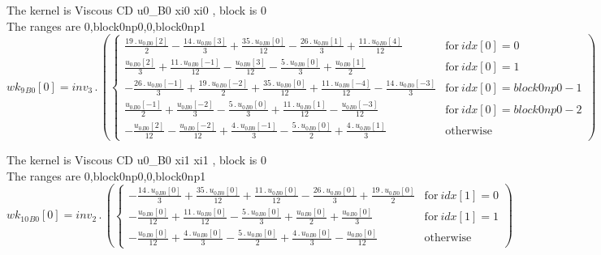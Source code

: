 \documentclass{article}
\begin{document}
\noindent The kernel is Viscous CD u0_B0 xi0 xi0 , block is 0\\\noindent The ranges are 0,block0np0,0,block0np1\\\begin{dmath}{wk_{9}{_{B0}}}[{0}] = inv_3 \,.\, \left(\begin{cases} \frac{19 \,.\, {u_{0}{_{B0}}}[{2}]}{2} - \frac{14 \,.\, {u_{0}{_{B0}}}[{3}]}{3} + \frac{35 \,.\, {u_{0}{_{B0}}}[{0}]}{12} - \frac{26 \,.\, {u_{0}{_{B0}}}[{1}]}{3} + \frac{11 \,.\, 
{u_{0}{_{B0}}}[{4}]}{12} & \text{for}\: {idx}[{0}] = 0 \\\frac{{u_{0}{_{B0}}}[{2}]}{3} + \frac{11 \,.\, {u_{0}{_{B0}}}[{-1}]}{12} - \frac{{u_{0}{_{B0}}}[{3}]}{12} - \frac{5 \,.\, {u_{0}{_{B0}}}[{0}]}{3} + \frac{{u_{0}{_{B0}}}[{1}]}{2} & \text{for}\: 
{idx}[{0}] = 1 \\- \frac{26 \,.\, {u_{0}{_{B0}}}[{-1}]}{3} + \frac{19 \,.\, {u_{0}{_{B0}}}[{-2}]}{2} + \frac{35 \,.\, {u_{0}{_{B0}}}[{0}]}{12} + \frac{11 \,.\, {u_{0}{_{B0}}}[{-4}]}{12} - \frac{14 \,.\, {u_{0}{_{B0}}}[{-3}]}{3} & \text{for}\: 
{idx}[{0}] = block0np0 - 1 \\\frac{{u_{0}{_{B0}}}[{-1}]}{2} + \frac{{u_{0}{_{B0}}}[{-2}]}{3} - \frac{5 \,.\, {u_{0}{_{B0}}}[{0}]}{3} + \frac{11 \,.\, {u_{0}{_{B0}}}[{1}]}{12} - \frac{{u_{0}{_{B0}}}[{-3}]}{12} & \text{for}\: {idx}[{0}] = block0np0 - 2 
\\- \frac{{u_{0}{_{B0}}}[{2}]}{12} - \frac{{u_{0}{_{B0}}}[{-2}]}{12} + \frac{4 \,.\, {u_{0}{_{B0}}}[{-1}]}{3} - \frac{5 \,.\, {u_{0}{_{B0}}}[{0}]}{2} + \frac{4 \,.\, {u_{0}{_{B0}}}[{1}]}{3} & \text{otherwise} \end{cases}\right)\end{dmath}

\noindent The kernel is Viscous CD u0_B0 xi1 xi1 , block is 0\\\noindent The ranges are 0,block0np0,0,block0np1\\\begin{dmath}{wk_{10}{_{B0}}}[{0}] = inv_2 \,.\, \left(\begin{cases} - \frac{14 \,.\, {u_{0}{_{B0}}}[{0}]}{3} + \frac{35 \,.\, {u_{0}{_{B0}}}[{0}]}{12} + \frac{11 \,.\, {u_{0}{_{B0}}}[{0}]}{12} - \frac{26 \,.\, {u_{0}{_{B0}}}[{0}]}{3} + \frac{19 
\,.\, {u_{0}{_{B0}}}[{0}]}{2} & \text{for}\: {idx}[{1}] = 0 \\- \frac{{u_{0}{_{B0}}}[{0}]}{12} + \frac{11 \,.\, {u_{0}{_{B0}}}[{0}]}{12} - \frac{5 \,.\, {u_{0}{_{B0}}}[{0}]}{3} + \frac{{u_{0}{_{B0}}}[{0}]}{2} + \frac{{u_{0}{_{B0}}}[{0}]}{3} & 
\text{for}\: {idx}[{1}] = 1 \\- \frac{{u_{0}{_{B0}}}[{0}]}{12} + \frac{4 \,.\, {u_{0}{_{B0}}}[{0}]}{3} - \frac{5 \,.\, {u_{0}{_{B0}}}[{0}]}{2} + \frac{4 \,.\, {u_{0}{_{B0}}}[{0}]}{3} - \frac{{u_{0}{_{B0}}}[{0}]}{12} & \text{otherwise} 
\end{cases}\right)\end{dmath}
\end{document}
